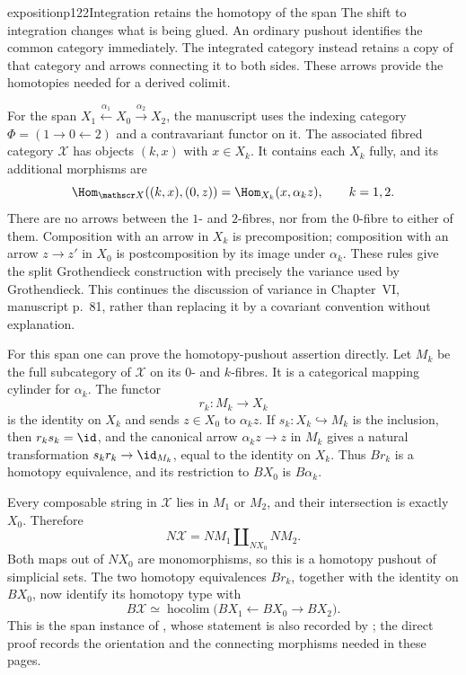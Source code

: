 \begin{dcomment}{exposition}{p122}{Integration retains the homotopy of the span}
The shift to integration changes what is being glued. An ordinary pushout identifies the common category immediately. The integrated category instead retains a copy of that category and arrows connecting it to both sides. These arrows provide the homotopies needed for a derived colimit.

For the span $X_1\xleftarrow{\alpha_1}X_0\xrightarrow{\alpha_2}X_2$, the manuscript uses the indexing category $\Phi=(1\to0\leftarrow2)$ and a contravariant functor on it. The associated fibred category $\mathscr X$ has objects $(k,x)$ with $x\in X_k$. It contains each $X_k$ fully, and its additional morphisms are
\[
 \Hom_{\mathscr X}((k,x),(0,z))
   =\Hom_{X_k}(x,\alpha_kz),\qquad k=1,2.
\]
There are no arrows between the $1$- and $2$-fibres, nor from the $0$-fibre to either of them. Composition with an arrow in $X_k$ is precomposition; composition with an arrow $z\to z'$ in $X_0$ is postcomposition by its image under $\alpha_k$. These rules give the split Grothendieck construction with precisely the variance used by Grothendieck. This continues the discussion of variance in Chapter~VI, manuscript p.~81, rather than replacing it by a covariant convention without explanation.

For this span one can prove the homotopy-pushout assertion directly. Let $M_k$ be the full subcategory of $\mathscr X$ on its $0$- and $k$-fibres. It is a categorical mapping cylinder for $\alpha_k$. The functor
\[
 r_k:M_k\longrightarrow X_k
\]
is the identity on $X_k$ and sends $z\in X_0$ to $\alpha_kz$. If $s_k:X_k\hookrightarrow M_k$ is the inclusion, then $r_ks_k=\id$, and the canonical arrow $\alpha_kz\to z$ in $M_k$ gives a natural transformation $s_kr_k\to\id_{M_k}$, equal to the identity on $X_k$. Thus $Br_k$ is a homotopy equivalence, and its restriction to $BX_0$ is $B\alpha_k$.

Every composable string in $\mathscr X$ lies in $M_1$ or $M_2$, and their intersection is exactly $X_0$. Therefore
\[
 N\mathscr X=NM_1\amalg_{NX_0}NM_2.
\]
Both maps out of $NX_0$ are monomorphisms, so this is a homotopy pushout of simplicial sets. The two homotopy equivalences $Br_k$, together with the identity on $BX_0$, now identify its homotopy type with
\[
 B\mathscr X\simeq
 \operatorname{hocolim}\bigl(BX_1\leftarrow BX_0\to BX_2\bigr).
\]
This is the span instance of \citet[Theorem~1.2]{Thomason1979}, whose statement is also recorded by \citet[Corollary~26.9]{ChacholskiScherer2001}; the direct proof records the orientation and the connecting morphisms needed in these pages.


\end{dcomment}
